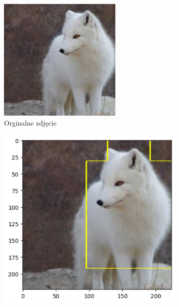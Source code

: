 \begin{figure}[h]
	\centering
	\begin{subfigure}[b]{0.3\textwidth}
		\includegraphics[width=.9\textwidth]{img/examples/appendix/n02120079_49517}
		\caption{Orginalne zdjęcie}  \label{}
	\end{subfigure}
	\begin{subfigure}[b]{0.3\textwidth}
		\centering\includegraphics[width=.9\textwidth]{img/examples/appendix/n02120079_49517_gradcam}

\end{subfigure}
\end{figure}
